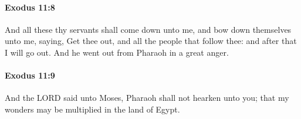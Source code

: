 		\paragraph{Exodus 11:8} %
			\label{EXODUS-11-8}

			And all these thy servants shall come down unto me, and bow down themselves unto me, saying, Get thee out, and all the people that follow thee: and after that I will go out. And he went out from Pharaoh in a great anger.


		\paragraph{Exodus 11:9} %
			\label{EXODUS-11-9}

			And the LORD said unto Moses, Pharaoh shall not hearken unto you; that my wonders may be multiplied in the land of Egypt.


